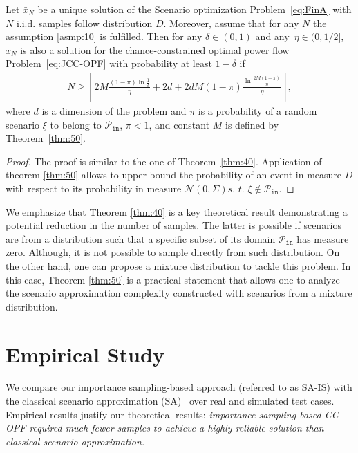 \begin{theorem}\label{thm:80}
Let $\bar x_N$ be a unique solution of the Scenario optimization Problem~\eqref{eq:FinA} with $N$ i.i.d. samples follow distribution $D$. Moreover, assume that for any $N$ the assumption \ref{asmp:10} is fulfilled. Then for any $\delta \in (0,1)$ and any~$\eta \in (0, 1/2]$, $\bar x_N$ is also a solution for the chance-constrained optimal power flow Problem~\eqref{eq:JCC-OPF} with probability at least $1-\delta$ if 
\begin{align*}
  N \ge \left\lceil 2M\frac{(1-\pi)\ln \frac{1}{\delta}}{\eta} + 2d + 2d M(1-\pi) \frac{\ln\frac{2M(1-\pi)}{\eta}}{\eta} \right\rceil, 
\end{align*} 
where $d$ is a dimension of the problem and $\pi$ is a probability of a random scenario $\xi$ to belong to $\mathcal{P}_{\texttt{in}}$, $\pi < 1$, and constant $M$ is defined by Theorem~\ref{thm:50}.
\end{theorem}
\begin{proof}
The proof is similar to the one of Theorem~\ref{thm:40}. Application of theorem \ref{thm:50} allows to upper-bound the probability of an event in measure $D$ with respect to its probability in measure $\mathcal{N}(0,\Sigma) \textit{s. t. } \xi\not\in\mathcal{P}_{\texttt{in}}$. 
\end{proof}

We emphasize that Theorem \ref{thm:40} is a key theoretical result demonstrating a potential reduction in the number of samples. The latter is possible if scenarios are from a distribution such that a specific subset of its domain $\mathcal{P}_{\texttt{in}}$ has measure zero. Although, it is not possible to sample directly from such distribution. On the other hand, one can propose a mixture distribution to tackle this problem. In this case, Theorem \ref{thm:50} is a practical statement that allows one to analyze the scenario approximation complexity constructed with scenarios from a mixture distribution.


\section{Empirical Study}\label{sec:emp}
We compare our importance sampling-based approach (referred to as SA-IS) with the classical scenario approximation (SA)~\cite{calafiore2006scenario} over real and simulated test cases.
Empirical results justify our theoretical results: \emph{importance sampling based CC-OPF required much fewer samples to achieve a highly reliable solution than classical scenario approximation.} 


